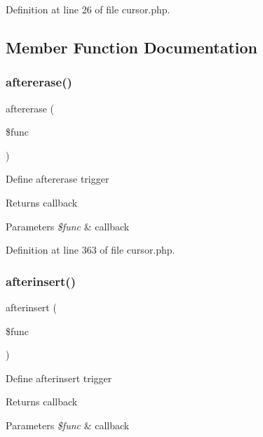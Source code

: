 Definition at line 26 of file cursor.\+php.



\subsection{Member Function Documentation}
\hypertarget{class_d_b_1_1_cursor_aa8c748ed4bf2cba7c84ce360e00dbe2a}{}\label{class_d_b_1_1_cursor_aa8c748ed4bf2cba7c84ce360e00dbe2a} 
\subsubsection{\texorpdfstring{aftererase()}{aftererase()}}
{\footnotesize\ttfamily aftererase (\begin{DoxyParamCaption}\item[{}]{\$func }\end{DoxyParamCaption})}

Define aftererase trigger \begin{DoxyReturn}{Returns}
callback 
\end{DoxyReturn}

\begin{DoxyParams}{Parameters}
{\em \$func} & callback \\
\hline
\end{DoxyParams}


Definition at line 363 of file cursor.\+php.

\hypertarget{class_d_b_1_1_cursor_a192a31bc101b9aafb4e1300883d33dc6}{}\label{class_d_b_1_1_cursor_a192a31bc101b9aafb4e1300883d33dc6} 
\subsubsection{\texorpdfstring{afterinsert()}{afterinsert()}}
{\footnotesize\ttfamily afterinsert (\begin{DoxyParamCaption}\item[{}]{\$func }\end{DoxyParamCaption})}

Define afterinsert trigger \begin{DoxyReturn}{Returns}
callback 
\end{DoxyReturn}

\begin{DoxyParams}{Parameters}
{\em \$func} & callback \\
\hline
\end{DoxyParams}


